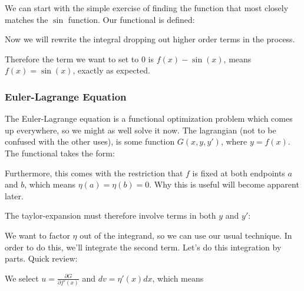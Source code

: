 \documentclass[12pt]{article}
\begin{document}
We can start with the simple exercise of finding the function that most closely matches the $\sin$ function. Our functional is defined:


Now we will rewrite the integral dropping out higher order terms in the process.


Therefore the term we want to set to 0 is $f(x)-\sin(x)$, means $f(x) = \sin(x)$, exactly as expected.

\subsubsection{Euler-Lagrange Equation}

The Euler-Lagrange equation is a functional optimization problem which comes up everywhere, so we might as well solve it now. The lagrangian (not to be confused with the other uses), is some function $G(x, y, y')$, where $y = f(x)$. The functional takes the form:


Furthermore, this comes with the restriction that $f$ is fixed at both endpoints $a$ and $b$, which means $\eta(a) = \eta(b) = 0$. Why this is useful will become apparent later.

The taylor-expansion must therefore involve terms in both $y$ and $y'$:


We want to factor $\eta$ out of the integrand, so we can use our usual technique. In order to do this, we'll integrate the second term. Let's do this integration by parts. Quick review:


We select $u = \frac{\partial G}{\partial f'(x)}$ and $dv = \eta'(x) dx$, which means

\end{document}
